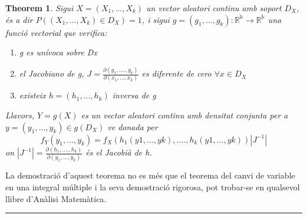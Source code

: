 \documentclass[
  catalan,
]{article}
\newtheorem{theorem}{Theorem}[section]
\theoremstyle{definition}
\theoremstyle{definition}
\theoremstyle{definition}
\theoremstyle{definition}
\theoremstyle{remark}
\begin{document}
\begin{theorem}
\protect\hypertarget{thm:thm-cambio}{}\label{thm:thm-cambio}Sigui \(X=(X_1,..., X_k)\) un vector aleatori continu amb soport \(D_X\), és a dir \(P((X_1,...,X_k) \in D_X)=1\), i sigui \(g=(g_1,...,g_k):\mathbb{R^k} \rightarrow  \mathbb{R^k}\) una funció vectorial que verifica:

\begin{enumerate}
\def\labelenumi{\arabic{enumi}.}
\item
  g es unívoca sobre Dx
\item
  el Jacobiano de g, \(J=\frac{\partial (g_1,....,g_k)}{\partial (x_1,...,x_k) }\) es diferente de cero \(\forall x \in D_X\)
\item
  existeix \(h=(h_1,...,h_k)\) inversa de g
\end{enumerate}

Llavors, \(Y=g(X)\) es un vector aleatori continu amb densitat conjunta per a \(y=(y_1,...,y_k) \in g(D_X)\) ve donada per
\[
f_Y(y_1,...,y_k)=f_X(h_1(y1,...,yk),....,h_k(y1,...,yk)) |J^{-1}|
\]
on \(|J^{-1}|=\frac{\partial (h_1,....,h_k)}{\partial (y_1,...,y_k) }\) és el Jacobià de h.
\end{theorem}

La demostració d'aquest teorema no es més que el teorema del canvi de variable en una integral múltiple i la seva demostració rigorosa, pot trobar-se en qualsevol llibre d'Anàlisi Matemàtica.

\begin{center}\rule{0.5\linewidth}{0.5pt}\end{center}
\end{document}
